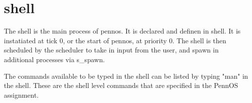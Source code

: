 \chapter{shell}
\hypertarget{md_doc_2shell}{}\label{md_doc_2shell}
The shell is the main process of pennos. It is declared and definen in shell. It is instatiated at tick 0, or the start of pennos, at priority 0. The shell is then scheduled by the scheduler to take in input from the user, and spawn in additional processes via s\+\_\+spawn.

The commands available to be typed in the shell can be listed by typing "{}man"{} in the shell. These are the shell level commands that are specified in the Penn\+OS assignment. 